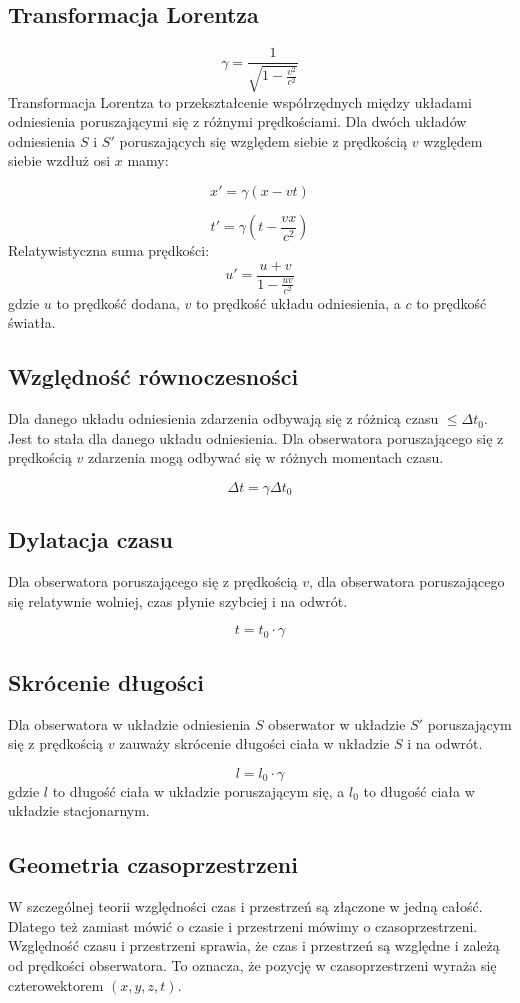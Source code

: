 \documentclass{../notatki}
\begin{document}
\subsection{Transformacja Lorentza}

$$
\gamma = \frac{1}{\sqrt{1 - \frac{v^2}{c^2}}}
$$
Transformacja Lorentza to przekształcenie współrzędnych między układami
odniesienia poruszającymi się z różnymi prędkościami. Dla dwóch układów
odniesienia $S$ i $S'$ poruszających się względem siebie z prędkością $v$
względem siebie wzdłuż osi $x$ mamy:

$$
x' = \gamma(x - vt)
$$

$$
t' = \gamma(t - \frac{vx}{c^2})
$$
Relatywistyczna suma prędkości:
$$
u' = \frac{u + v}{1 - \frac{uv}{c^2}}
$$
gdzie $u$ to prędkość dodana, $v$ to prędkość układu odniesienia, a $c$ to
prędkość światła.

\subsection{Względność równoczesności}

Dla danego układu odniesienia zdarzenia odbywają się z różnicą czasu
$\le \Delta t_0$. Jest to stała dla danego układu odniesienia.
Dla obserwatora poruszającego się z prędkością $v$ zdarzenia
mogą odbywać się w różnych momentach czasu.

$$
\Delta t = \gamma \Delta t_0
$$

\subsection{Dylatacja czasu}

Dla obserwatora poruszającego się z prędkością $v$, dla obserwatora
poruszającego
się relatywnie wolniej, czas płynie szybciej i na odwrót.

$$
t = t_0 \cdot \gamma
$$

\subsection{Skrócenie długości}

Dla obserwatora w układzie odniesienia $S$ obserwator w układzie $S'$
poruszającym się z prędkością $v$ zauważy skrócenie długości ciała
w układzie $S$ i na odwrót.

$$
l = l_0 \cdot \gamma
$$
gdzie $l$ to długość ciała w układzie poruszającym się, a $l_0$ to długość
ciała w układzie stacjonarnym.

\subsection{Geometria czasoprzestrzeni}

W szczególnej teorii względności czas i przestrzeń są złączone w jedną
całość. Dlatego też zamiast mówić o czasie i przestrzeni mówimy o
czasoprzestrzeni.
Względność czasu i przestrzeni sprawia, że czas i przestrzeń są względne
i zależą od prędkości obserwatora. To oznacza, że pozycję w czasoprzestrzeni
wyraża się czterowektorem $(x, y, z, t)$.
\end{document}
